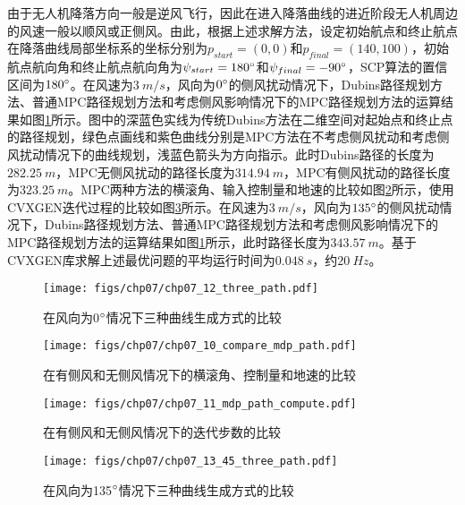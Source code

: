 由于无人机降落方向一般是逆风飞行，因此在进入降落曲线的进近阶段无人机周边的风速一般以顺风或正侧风。由此，根据上述求解方法，设定初始航点和终止航点在降落曲线局部坐标系的坐标分别为$p_{start} = (0,0)$和$p_{final}=(140,100)$，初始航点航向角和终止航点航向角为$\psi_{start}=180\degree$和$\psi_{final} = -90\degree$，SCP算法的置信区间为$180\degree$。在风速为$3\ m/s$，风向为$0\degree$的侧风扰动情况下，Dubins路径规划方法、普通MPC路径规划方法和考虑侧风影响情况下的MPC路径规划方法的运算结果如图\ref{fig:chp07_12_three_path}所示。图中的深蓝色实线为传统Dubins方法在二维空间对起始点和终止点的路径规划，绿色点画线和紫色曲线分别是MPC方法在不考虑侧风扰动和考虑侧风扰动情况下的曲线规划，浅蓝色箭头为方向指示。此时Dubins路径的长度为$282.25\ m$，MPC无侧风扰动的路径长度为$314.94\ m$，MPC有侧风扰动的路径长度为$323.25\ m$。MPC两种方法的横滚角、输入控制量和地速的比较如图\ref{fig:chp07_10_compare_mdp_path}所示，使用CVXGEN迭代过程的比较如图\ref{fig:chp07_11_mdp_path_compute}所示。在风速为$3\ m/s$，风向为$135\degree$的侧风扰动情况下，Dubins路径规划方法、普通MPC路径规划方法和考虑侧风影响情况下的MPC路径规划方法的运算结果如图\ref{fig:chp07_12_three_path}所示，此时路径长度为$343.57\ m$。基于CVXGEN库求解上述最优问题的平均运行时间为$0.048\ s$，约$20\ Hz$。

\begin{figure}[ht]   
	\centering
	\texttt{[image: figs/chp07/chp07\_12\_three\_path.pdf]}
	\caption{在风向为0$\degree$情况下三种曲线生成方式的比较}
	\label{fig:chp07_12_three_path}
\end{figure}

\begin{figure}[ht]   
	\centering
	\texttt{[image: figs/chp07/chp07\_10\_compare\_mdp\_path.pdf]}
	\caption{在有侧风和无侧风情况下的横滚角、控制量和地速的比较}
	\label{fig:chp07_10_compare_mdp_path}
\end{figure}

\begin{figure}[ht]   
	\centering
	\texttt{[image: figs/chp07/chp07\_11\_mdp\_path\_compute.pdf]}
	\caption{在有侧风和无侧风情况下的迭代步数的比较}
	\label{fig:chp07_11_mdp_path_compute}
\end{figure}



\begin{figure}[ht]   
	\centering
	\texttt{[image: figs/chp07/chp07\_13\_45\_three\_path.pdf]}
	\caption{在风向为135$\degree$情况下三种曲线生成方式的比较}
	\label{fig:chp07_13_45_three_path}
\end{figure}

